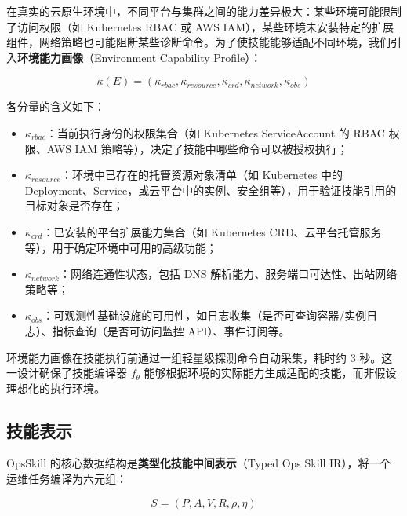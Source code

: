 \documentclass[11pt,a4paper]{ctexart}
\begin{document}
在真实的云原生环境中，不同平台与集群之间的能力差异极大：某些环境可能限制了访问权限（如 Kubernetes RBAC 或 AWS IAM），某些环境未安装特定的扩展组件，网络策略也可能阻断某些诊断命令。为了使技能能够适配不同环境，我们引入\textbf{环境能力画像}（Environment Capability Profile）：

\begin{equation}
\kappa(E) = (\kappa_{rbac}, \kappa_{resource}, \kappa_{crd}, \kappa_{network}, \kappa_{obs})
\end{equation}

\noindent 各分量的含义如下：
\begin{itemize}[leftmargin=2em]
  \item $\kappa_{rbac}$：当前执行身份的权限集合（如 Kubernetes ServiceAccount 的 RBAC 权限、AWS IAM 策略等），决定了技能中哪些命令可以被授权执行；
  \item $\kappa_{resource}$：环境中已存在的托管资源对象清单（如 Kubernetes 中的 Deployment、Service，或云平台中的实例、安全组等），用于验证技能引用的目标对象是否存在；
  \item $\kappa_{crd}$：已安装的平台扩展能力集合（如 Kubernetes CRD、云平台托管服务等），用于确定环境中可用的高级功能；
  \item $\kappa_{network}$：网络连通性状态，包括 DNS 解析能力、服务端口可达性、出站网络策略等；
  \item $\kappa_{obs}$：可观测性基础设施的可用性，如日志收集（是否可查询容器/实例日志）、指标查询（是否可访问监控 API）、事件订阅等。
\end{itemize}

\noindent 环境能力画像在技能执行前通过一组轻量级探测命令自动采集，耗时约 3 秒。这一设计确保了技能编译器 $f_\theta$ 能够根据环境的实际能力生成适配的技能，而非假设理想化的执行环境。

\subsection{技能表示}

OpsSkill 的核心数据结构是\textbf{类型化技能中间表示}（Typed Ops Skill IR），将一个运维任务编译为六元组：

\begin{equation}
S = (P, A, V, R, \rho, \eta)
\end{equation}
\end{document}
